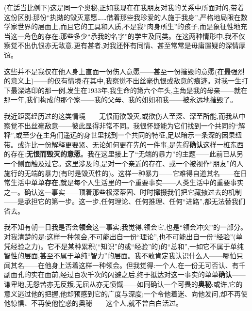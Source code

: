 (在适当比例下)这是同一个奥秘,正如我现在在我朋友对我的关系中所面对的,带着这份区别:那份“执拗的毁灭意愿……借着那些我珍爱的人施于我身”,严格地局限在数学家世界的层面上,而且它的工具和人质,不是我“肉身所生”的孩子,而是象征性地充当这一角色的存在:那些多少“承我的名字”的学生及同类。在这两种情形中,我不仅察觉不出仇恨亦无敌意,更有甚者,对我还怀有同情、甚至常常是毋庸置疑的深情厚谊。

这些并不是我仅在他人身上直面一份伤人意愿——甚至一份摧毁的意愿\dmark{}(在最强烈的意义上)——的仅有情境:在其中,我察觉不出丝毫仇恨或敌意的痕迹。对我一生打下最深烙印的那一例,发生在1933年,我生命的第六个年头,主角是我的母亲——就在那一年,我们构成的那个家——我的父母、我的姐姐和我——被永远地摧毁了。

我近距离经历过的这类情境——无恨而欲毁灭,或欲伤人至深、深至所能,而我从中察觉不出丝毫敌意——彼此显得非常不同。我很怀疑能为它们找到一个共同的“解释”,或至少在主角们遥远的身世里找到一个共同的特征,足以暗示一条深的因果纽带。或许比一份解释更要紧、无论如何更在先的一件事,是先得\textbf{确认}这样一桩东西的存在:\textbf{无恨而毁灭的意愿}。我在这里接上了“无端的暴力”的主题——此前已从另一个侧面触及过它。这里涉及的,是对一个亲近的存在、或一个被视作“朋友”的人施行的无端的暴力(有时是毁灭性的)。这样一种暴力——它难得自道其名\dmark{}——在日常生活中单单\textbf{存在},就是每个人生活里的一个重要事实——人类生活中的重要事实之一。确认这一事实——顶着那些根深蒂固、时时撺掇我们把它藏掖过去的机制——是承担它的第一步。这一步,任何理论、任何推理、任何“进路”,都无法替我们省去。

我不知有朝一日我是否会\textbf{领会}这一事实;我觉得,领会它,也是“领会冲突”的一部分。对我清楚的是:这样一种领会,不可能出自一份“理论”,也不可能出自一份“经验”(单凭经验之力)。它不是某种累积(“知识”的或“经验”的)的“总和”,一如它不属于单纯智性的层面,甚至不属于单纯“智力”的层面。我不敢肯定我认识什么人——哪怕只闻其名——在他身上活着这样一种领会。但我觉得:一个人,在一份无可否认、有千副面孔的实在面前,经过百次千次的闪避之后,终于抵达对这一事实的单单\textbf{确认}——谦卑地,无怨苦亦无反叛,无屈从亦无愤慨——如同确认一个可畏的\textbf{奥秘}:或许,它的意义逃过他的把握,他却预感到它的广度与深度;一个令他着迷、向他发问,却不再使他惊惧、不再使他惶惑的奥秘——这个人,就不曾白白活过。


